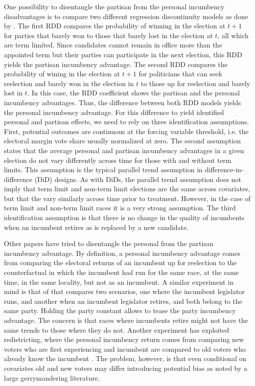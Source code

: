\documentclass[12pt]{amsart}
\numberwithin{equation}{section}
\theoremstyle{definition}
\theoremstyle{definition}
\theoremstyle{definition}
\begin{document}
One possibility to disentangle the partisan from the personal incumbency disadvantages is to compare two different regression discontinuity models as done by \citet{fowler_hall_2014}. The first RDD compares the probability of winning in the election at $t+1$ for parties that barely won to those that barely lost in the election at $t$, all which are term limited. Since candidates cannot remain in office more than the appointed term but their parties can participate in the next election, this RDD yields the partisan incumbency advantage. The second RDD compares the probability of wining in the election at $t+1$ for politicians that can seek reelection and barely won in the election in $t$ to those up for reelection and barely lost in $t$. In this case, the RDD coefficient shows the partisan and the personal incumbency advantages. Thus, the difference between both RDD models yields the personal incumbency advantage. For this difference to yield identified personal and partisan effects, we need to rely on three identification assumptions. First, potential outcomes are continuous at the forcing variable threshold, i.e. the electoral margin vote share usually normalized at zero. The second assumption states that the average personal and partisan incumbency advantages in a given election do not vary differently across time for those with and without term limits. This assumption is the typical parallel trend assumption in difference-in-difference (DiD) designs. As with DiDs, the parallel trend assumption does not imply that term limit and non-term limit elections are the same across covariates, but that the vary similarly across time prior to treatment. However, in the case of term limit and non-term limit races it is a very strong assumption. The third identification assumption is that there is no change in the quality of incumbents when an incumbent retires as is replaced by a new candidate. 

Other papers have tried to disentangle the personal from the partisan incumbency advantage. By definition, a personal incumbency advantage comes from comparing the electoral returns of an incumbent up for reelection to the counterfactual in which the incumbent had run for the same race, at the same time, in the same locality, but not as an incumbent. A similar experiment in mind is that of \citet{gelman_king_1990} that compares two scenarios, one where the incumbent legislator runs, and another when an incumbent legislator retires, and both belong to the same party. Holding the party constant allows to tease the party incumbency advantage. The concern is that races where incumbents retire might not have the same trends to those where they do not. Another experiment has exploited redistricting, where the personal incumbency return comes from comparing  new voters who are first experiencing and incumbent are compared to old voters who already know the incumbent \citep{sekhon_titiunik_2012}. The problem, however, is that even conditional on covariates old and new voters may differ introducing potential bias as noted by a large gerrymandering literature. 
\end{document}
